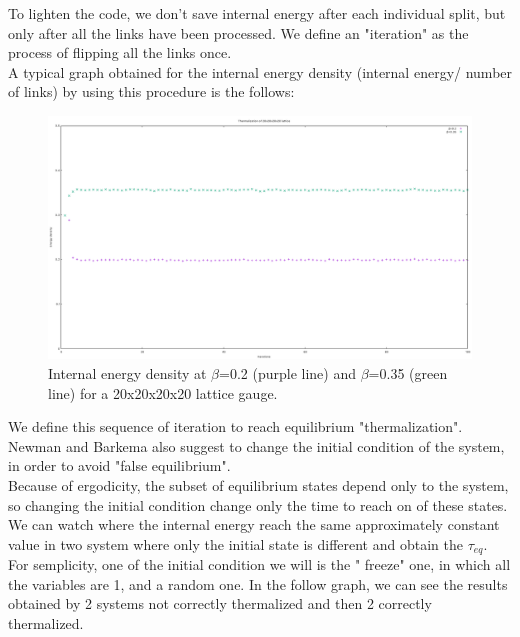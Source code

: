         \noindent
        To lighten the code, we don't save internal energy after each individual split, but only after all the links have been processed. We define an "iteration" as the process of flipping all the links once. \\
        A typical graph obtained for the internal energy density (internal energy/ number of links) by using this procedure is the follows:  
        \noindent
        \begin{figure}[H]
            \centering
            \includegraphics[scale=0.2]{Thermalization3.pdf}
            \caption{Internal energy density at $\beta$=0.2 (purple line) and $\beta$=0.35 (green line) for a 20x20x20x20 lattice gauge.}
            \label{fig:Thermalization} 
        \end{figure}
        \noindent
        We define this sequence of iteration to reach equilibrium "thermalization".\\ 
        Newman and Barkema \cite{NewBar} also suggest to change the initial condition of the system, in order to avoid "false equilibrium". \\
        Because of ergodicity, the subset of equilibrium states depend only to the system, so changing the initial condition change only the time to reach on of these states. \\
        We can watch where the internal energy reach the same approximately constant value in two system where only the initial state is different and obtain
        the $\tau_{eq}$.
        For semplicity, one of the initial condition we will is the " freeze" one, in which all the variables are 1, and a random one. In the follow graph, we can see 
        the results obtained by 2 systems not correctly thermalized and then 2 correctly thermalized.\\

